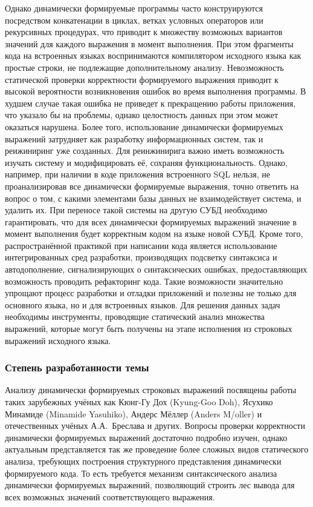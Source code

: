 Однако динамически формируемые программы часто конструируются посредством конкатенации в циклах, ветках условных операторов или рекурсивных процедурах, что приводит к множеству возможных вариантов значений для каждого выражения в момент выполнения. При этом фрагменты кода на встроенных языках воспринимаются компилятором исходного языка как простые строки, не подлежащие дополнительному анализу. Невозможность статической проверки корректности формируемого выражения приводит к высокой вероятности возникновения ошибок во время выполнения программы. В худшем случае такая ошибка не приведет к прекращению работы приложения, что указало бы на проблемы, однако целостность данных при этом может оказаться нарушена. Более того, использование динамически формируемых выражений затрудняет как разработку информационных систем, так и реижиниринг уже созданных. Для реинжинирига важно иметь возможность изучать систему и модифицировать её, сохраняя функциональность. Однако, например, при наличии в коде приложения встроенного SQL нельзя, не проанализировав все динамически формируемые выражения, точно ответить на вопрос о том, с какими элементами базы данных не взаимодействует система, и  удалить их. При переносе такой системы на другую СУБД необходимо гарантировать, что для всех динамически формируемых выражений значение в момент выполнения будет корректным кодом на языке новой СУБД. Кроме того, распространённой практикой при написании кода является использование интегрированных сред разработки, производящих подсветку синтаксиса и автодополнение, сигнализирующих о синтаксических ошибках, предоставляющих возможность проводить рефакторинг кода. Такие возможности значительно упрощают процесс разработки и отладки приложений и полезны не только для основного языка, но и для встроенных языков. Для решения данных задач необходимы инструменты, проводящие статический анализ множества выражений, которые могут быть получены на этапе исполнения из строковых выражений исходного языка.  


\subsubsection*{\large{Степень разработанности темы}}

Анализу динамически формируемых строковых выражений посвящены работы таких зарубежных учёных как Кюнг-Гу Дох (Kyung-Goo Doh), Ясухико Минамиде (Minamide Yasuhiko), Андерс Мёллер (Anders M/oller) и отечественных учёных А.А.~Бреслава и других. Вопросы проверки корректности динамически формируемых выражений достаточно подробно изучен, однако актуальным представляется так же проведение более сложных видов статического анализа, требующих построения структурного представления динамически формируемого кода. То есть требуется механизм синтаксического анализа динамически формируемых выражений, позволяющий строить лес вывода для всех возможных значений соответствующего выражения. 

